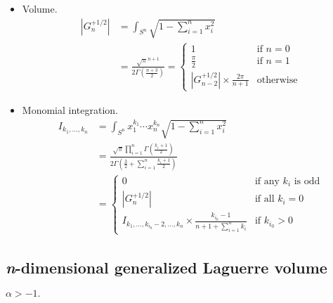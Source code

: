 \documentclass[draft]{scrartcl}
\begin{document}
\begin{itemize}
  \item Volume.
    \begin{align}\nonumber
    |G_n^{+1/2}|
      &= \int_{S^n} \sqrt{1 - \sum_{i=1}^n x_i^2}\\
      &= \frac{
        \sqrt{\pi}^{n+1}
      }{
        2\Gamma\left(\frac{n+3}{2}\right)
      }
      = \begin{cases}
        1&\text{if $n=0$}\\
        \frac{\pi}{2}&\text{if $n=1$}\\
        |G_{n-2}^{+1/2}| \times \frac{2\pi}{n+1}&\text{otherwise}
      \end{cases}
    \end{align}

  \item Monomial integration.
    \begin{align}\nonumber
    I_{k_1,\dots,k_n}
      &= \int_{S^n} x_1^{k_1}\cdots x_n^{k_n} \sqrt{1 - \sum_{i=1}^n
      x_i^2}\\
      &= \frac{
        \sqrt{\pi}\prod_{i=1}^n \Gamma\left(\frac{k_i+1}{2}\right)
      }{
        2\Gamma\left(\frac{3}{2} + \sum_{i=1}^n \frac{k_i+1}{2}\right)
      }\\
      &= \begin{cases}
        0&\text{if any $k_i$ is odd}\\
        |G_n^{+1/2}|&\text{if all $k_i=0$}\\
        I_{k_1,\dots,k_{i_0}-2,\dots,k_n} \times \frac{k_{i_0}-1}{n + 1 + \sum_{i=1}^n k_i}&\text{if $k_{i_0} > 0$}
      \end{cases}
    \end{align}
\end{itemize}


\subsection*{\textit{n}-dimensional generalized Laguerre volume}

$\alpha > -1.$
\end{document}
